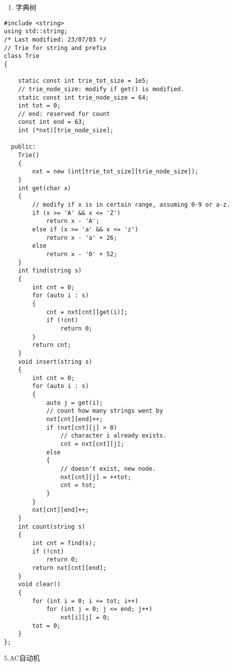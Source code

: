 \documentclass[]{article}
\providecommand{\tightlist}{%
  \setlength{\itemsep}{0pt}\setlength{\parskip}{0pt}}
\begin{document}
\begin{enumerate}
\def\labelenumi{\arabic{enumi}.}
\setcounter{enumi}{3}
\tightlist
\item
  字典树
\end{enumerate}

\begin{verbatim}
#include <string>
using std::string;
/* Last modified: 23/07/03 */
// Trie for string and prefix
class Trie
{

    static const int trie_tot_size = 1e5;
    // trie_node_size: modify if get() is modified.
    static const int trie_node_size = 64;
    int tot = 0;
    // end: reserved for count
    const int end = 63;
    int (*nxt)[trie_node_size];

  public:
    Trie()
    {
        nxt = new (int[trie_tot_size][trie_node_size]);
    }
    int get(char x)
    {
        // modify if x is in certain range, assuming 0-9 or a-z.
        if (x >= 'A' && x <= 'Z')
            return x - 'A';
        else if (x >= 'a' && x <= 'z')
            return x - 'a' + 26;
        else
            return x - '0' + 52;
    }
    int find(string s)
    {
        int cnt = 0;
        for (auto i : s)
        {
            cnt = nxt[cnt][get(i)];
            if (!cnt)
                return 0;
        }
        return cnt;
    }
    void insert(string s)
    {
        int cnt = 0;
        for (auto i : s)
        {
            auto j = get(i);
            // count how many strings went by
            nxt[cnt][end]++;
            if (nxt[cnt][j] > 0)
                // character i already exists.
                cnt = nxt[cnt][j];
            else
            {
                // doesn't exist, new node.
                nxt[cnt][j] = ++tot;
                cnt = tot;
            }
        }
        nxt[cnt][end]++;
    }
    int count(string s)
    {
        int cnt = find(s);
        if (!cnt)
            return 0;
        return nxt[cnt][end];
    }
    void clear()
    {
        for (int i = 0; i <= tot; i++)
            for (int j = 0; j <= end; j++)
                nxt[i][j] = 0;
        tot = 0;
    }
};
\end{verbatim}

5.AC自动机
\end{document}
